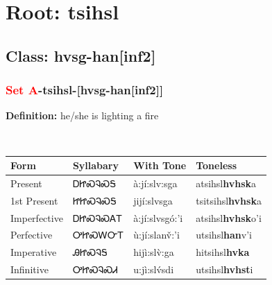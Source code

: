 \needspace{4in}
\section*{Root: tsihsl}
\nopagebreak
{}
\needspace{3in}
\subsection*{Class: hvsg-han[inf2]}
\nopagebreak
\needspace{2in}
\subsubsection*{\textcolor{Red}{Set A}{-}\textbf{tsihsl}{-}[hvsg-han[inf2]]}
\nopagebreak
\textbf{Definition: } he/she is lighting a fire
\\[0.5em]
\begin{tabularx}{\textwidth}{l X X X}%
\toprule%
\textbf{Form}&\textbf{Syllabary}&\textbf{With Tone}&\textbf{Toneless}\\%
\midrule%
Present&ᎠᏥᏍᎸᏍᎦ&à:jí:slv:sga&atsihsl\textbf{hvhsk}a\\%
1st Present&ᏥᏥᏍᎸᏍᎦ&jijí:slvsga&tsitsihsl\textbf{hvhsk}a\\%
Imperfective&ᎠᏥᏍᎸᏍᎪᎢ&à:jí:slvsgó:’i&atsihsl\textbf{hvhsk}o'i\\%
Perfective&ᎤᏥᏍᎳᏅᎢ&ù:jí:slanv̌:’i&utsihsl\textbf{han}v'i\\%
Imperative&ᎯᏥᏍᎸᎦ&hijì:slv̀:ga&hitsihsl\textbf{hvka}\\%
Infinitive&ᎤᏥᏍᎸᏍᏗ&u:jì:slv́sdi&utsihsl\textbf{hvhst}i\\%
\bottomrule%
\end{tabularx}
\\[1em]